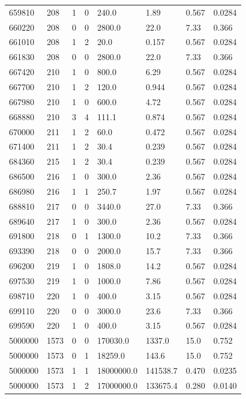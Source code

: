 \documentclass[preview]{standalone}
\begin{document}
{{{{{{\begin{tabular}{L{1.2cm}C{1.2cm} C{0.3cm}C{0.5cm} C{1.4cm}C{1.4cm} C{1.4cm}C{1.4cm}}
  659810  &   208  & 1     &  0 &  240.0  & 1.89  & 0.567 &  0.0284   \\ 
  660220  &   208  & 0     &  0 &  2800.0  & 22.0  & 7.33 &  0.366   \\ 
  661010  &   208  & 1     &  2 &  20.0  & 0.157  & 0.567 &  0.0284   \\ 
  661830  &   208  & 0     &  0 &  2800.0  & 22.0  & 7.33 &  0.366   \\ 
  667420  &   210  & 1     &  0 &  800.0  & 6.29  & 0.567 &  0.0284   \\ 
  667700  &   210  & 1     &  2 &  120.0  & 0.944  & 0.567 &  0.0284   \\ 
  667980  &   210  & 1     &  0 &  600.0  & 4.72  & 0.567 &  0.0284   \\ 
  668880  &   210  & 3     &  4 &  111.1  & 0.874  & 0.567 &  0.0284   \\ 
  670000  &   211  & 1     &  2 &  60.0  & 0.472  & 0.567 &  0.0284   \\ 
  671400  &   211  & 1     &  2 &  30.4  & 0.239  & 0.567 &  0.0284   \\ 
  684360  &   215  & 1     &  2 &  30.4  & 0.239  & 0.567 &  0.0284   \\ 
  686500  &   216  & 1     &  0 &  300.0  & 2.36  & 0.567 &  0.0284   \\ 
  686980  &   216  & 1     &  1 &  250.7  & 1.97  & 0.567 &  0.0284   \\ 
  688810  &   217  & 0     &  0 &  3440.0  & 27.0  & 7.33 &  0.366   \\ 
  689640  &   217  & 1     &  0 &  300.0  & 2.36  & 0.567 &  0.0284   \\ 
  691800  &   218  & 0     &  1 &  1300.0  & 10.2  & 7.33 &  0.366   \\ 
  693390  &   218  & 0     &  0 &  2000.0  & 15.7  & 7.33 &  0.366   \\ 
  696200  &   219  & 1     &  0 &  1808.0  & 14.2  & 0.567 &  0.0284   \\ 
  697530  &   219  & 1     &  0 &  1000.0  & 7.86  & 0.567 &  0.0284   \\ 
  698710  &   220  & 1     &  0 &  400.0  & 3.15  & 0.567 &  0.0284   \\ 
  699110  &   220  & 0     &  0 &  3000.0  & 23.6  & 7.33 &  0.366   \\ 
  699590  &   220  & 1     &  0 &  400.0  & 3.15  & 0.567 &  0.0284   \\ 
  5000000  &  1573  & 0     &  0 &  170030.0  & 1337.0  & 15.0 &  0.752   \\ 
  5000000  &  1573  & 0     &  1 &  18259.0  & 143.6  & 15.0 &  0.752   \\ 
  5000000  &  1573  & 1     &  1 &  18000000.0  & 141538.7  & 0.470 &  0.0235   \\ 
  5000000  &  1573  & 1     &  2 &  17000000.0  & 133675.4  & 0.280 &  0.0140   \\ 
\hline 
\end{tabular} 

}}}}}}
\end{document}
